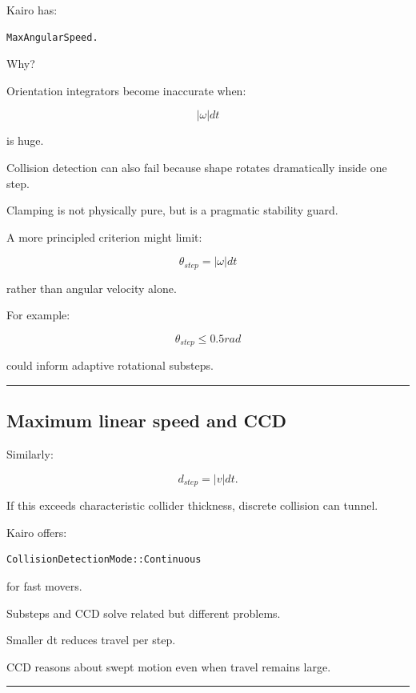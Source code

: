 Kairo has:

\begin{verbatim}
MaxAngularSpeed.
\end{verbatim}

Why?

Orientation integrators become inaccurate when:

\[
|\omega|dt
\]

is huge.

Collision detection can also fail because shape rotates dramatically inside one step.

Clamping is not physically pure, but is a pragmatic stability guard.

A more principled criterion might limit:

\[
\theta_{step}
=
|\omega|dt
\]

rather than angular velocity alone.

For example:

\[
\theta_{step}\le0.5rad
\]

could inform adaptive rotational substeps.

\begin{center}\rule{0.5\linewidth}{0.5pt}\end{center}

\subsection{Maximum linear speed and CCD}\label{06-engine-ii-ch038-maximum-linear-speed-and-ccd}

\hypertarget{06-engine-ii-ch038-maximum-linear-speed-and-ccd}{}

Similarly:

\[
d_{step}
=
|v|dt.
\]

If this exceeds characteristic collider thickness, discrete collision can tunnel.

Kairo offers:

\begin{verbatim}
CollisionDetectionMode::Continuous
\end{verbatim}

for fast movers.

Substeps and CCD solve related but different problems.

Smaller dt reduces travel per step.

CCD reasons about swept motion even when travel remains large.

\begin{center}\rule{0.5\linewidth}{0.5pt}\end{center}

